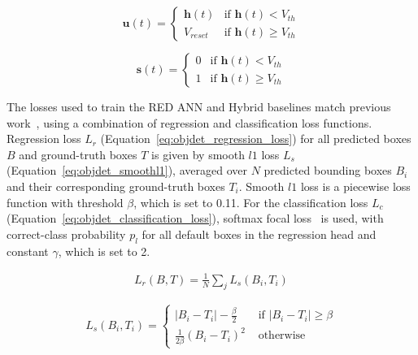 \begin{equation}
    \mathbf{u}(t) = 
    \begin{cases}
        \mathbf{h}(t) & \text{if } \mathbf{h}(t) < V_{th} \\
        V_{reset} & \text{if } \mathbf{h}(t) \geq V_{th}
    \end{cases}
    \label{eq:spikingjelly_u}
\end{equation}

\begin{equation}
    \mathbf{s}(t) = 
    \begin{cases}
        0 & \text{if } \mathbf{h}(t) < V_{th} \\
        1 & \text{if } \mathbf{h}(t) \geq V_{th}
    \end{cases}
    \label{eq:spikingjelly_spike}
\end{equation}

The losses used to train the RED ANN and Hybrid baselines match previous work~\cite{Perot2020}, using a combination of regression and classification loss functions. Regression loss $L_r$ (Equation~\ref{eq:objdet_regression_loss}) for all predicted boxes $B$ and ground-truth boxes $T$ is given by smooth $l1$ loss $L_s$~\cite{Liu_2016} (Equation~\ref{eq:objdet_smoothl1}), averaged over $N$ predicted bounding boxes $B_i$ and their corresponding ground-truth boxes $T_i$. Smooth $l1$ loss is a piecewise loss function with threshold $\beta$, which is set to 0.11. For the classification loss ${L}_{c}$ (Equation~\ref{eq:objdet_classification_loss}), softmax focal loss~\cite{lin20focal} is used, with correct-class probability $p_l$ for all default boxes in the regression head and constant $\gamma$, which is set to 2.

\begin{equation}
\begin{aligned}
L_r(B, T)= \frac{1}{N} \sum_{j} L_s\left(B_{i}, T_{i}\right)
\end{aligned} \label{eq:objdet_regression_loss}
\end{equation}

\begin{equation}
{L}_{s}\left(B_{i}, T_{i}\right)=
\begin{cases}
\left|B_{i}-T_{i}\right|-\frac{\beta}{2} & \text { if }\left|B_{i}-T_{i}\right| \geq \beta \\
\frac{1}{2 \beta}\left(B_{i}-T_{i}\right)^{2} & \text { otherwise }
\end{cases} \label{eq:objdet_smoothl1}
\end{equation}

